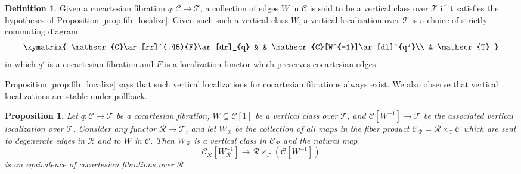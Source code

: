 \documentclass[reqno]{amsart}
\newtheorem{proposition}[lemma]{Proposition}
\theoremstyle{definition}
\newtheorem{definition}[lemma]{Definition}
\newcommand{\msc}[1]{\mathscr{#1}}
\renewcommand{\1}{\mathbf{1}}
\begin{document}
\begin{definition}\label{def:vertical}
Given a cocartesian fibration $q:\msc{C}\to \msc{T}$, a collection of edges $W$ in $\msc{C}$ is said to be a vertical class over $\msc{T}$ if it satisfies the hypotheses of Proposition \ref{prop:fib_localize}.  Given such such a vertical class $W$, a vertical localization over $\msc{T}$ is a choice of strictly commuting diagram
\[
\xymatrix{
\msc{C}\ar[rr]^(.45){F}\ar[dr]_{q} & & \msc{C}[W^{-1}]\ar[dl]^{q'}\\
	& \msc{T}
}
\]
in which $q'$ is a cocartesian fibration and $F$ is a localization functor which preserves cocartesian edges.
\end{definition}

Proposition \ref{prop:fib_localize} says that such vertical localizations for cocartesian fibrations always exist. We also observe that vertical localizations are stable under pullback.

\begin{proposition}\label{prop:vert_pullback}
Let $q:\msc{C}\to \msc{T}$ be a cocartesian fibration, $W\subseteq\msc{C}[1]$ be a vertical class over $\msc{T}$, and $\msc{C}[W^{-1}]\to \msc{T}$ be the associated vertical localization over $\msc{T}$.  Consider any functor $\msc{R}\to \msc{T}$, and let $W_{\msc{R}}$ be the collection of all maps in the fiber product $\msc{C}_{\msc{R}}=\msc{R}\times_{\msc{T}}\msc{C}$ which are sent to degenerate edges in $\msc{R}$ and to $W$ in $\msc{C}$.  Then $W_{\msc{R}}$ is a vertical class in $\msc{C}_{\msc{R}}$ and the natural map
\begin{equation}\label{eq:1893}
\msc{C}_{\msc{R}}[W_{\msc{R}}^{-1}]\to \msc{R}\times_{\msc{T}}(\msc{C}[W^{-1}])
\end{equation}
is an equivalence of cocartesian fibrations over $\msc{R}$.
\end{proposition}
\end{document}
